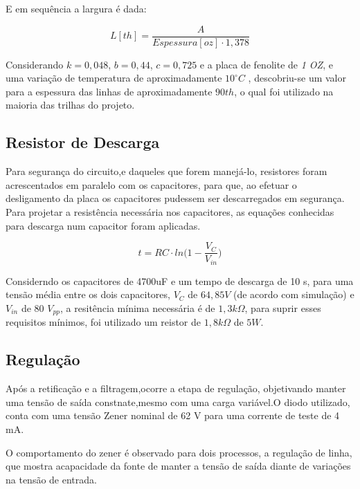 \documentclass[a4paper,12pt,oneside,openany,table,xcdraw]{article}
\begin{document}
E em sequência a largura é dada:

\begin{equation}
L [\mathit{th}] = \dfrac{A}{Espessura [oz] \cdot 1,378}
 \end{equation}
\vspace{0.3cm}

Considerando  $k = 0,048$, $b = 0,44$, $c = 0,725$ e a placa de fenolite de \emph{1 OZ}, e uma variação de temperatura de aproximadamente $10^{\circ}C$ , descobriu-se um valor para a espessura das linhas de aproximadamente $90 th$, o qual foi utilizado na maioria das trilhas do projeto.


\subsection{Resistor de Descarga} \label{descarga}

Para segurança do circuito,e daqueles que forem manejá-lo, resistores foram acrescentados em paralelo com os capacitores, para que, ao efetuar o desligamento da placa os capacitores pudessem ser descarregados em segurança.
Para projetar a resistência necessária nos capacitores, as equações conhecidas para descarga num capacitor foram aplicadas.

\begin{equation}
t= RC \cdot ln\bigg( 1 - \frac{V_{C}}{V_{in}} \bigg) 
\end{equation}

Considerndo os capacitores de 4700uF e um tempo de descarga de 10 s, para uma tensão média entre os dois capacitores, $V_{C}$ de $64,85 V$ (de acordo com simulação) e $V_{in}$ de 80 $V_{pp}$, a resitência mínima necessária é de $1,3 k\Omega$, para suprir esses requisitos mínimos, foi utilizado um reistor de $1,8 k\Omega$ de $5W$. 


\subsection{Regulação}

Após a retificação e a filtragem,ocorre a etapa de regulação, objetivando manter uma tensão de saída constnate,mesmo com uma carga variável.O diodo utilizado, conta com uma tensão Zener nominal de 62 V para uma corrente de teste de 4 mA.

O comportamento do zener é observado para dois processos, a regulação de linha, que mostra acapacidade da fonte de manter a tensão de saída diante de variações na tensão de entrada.
\end{document}
